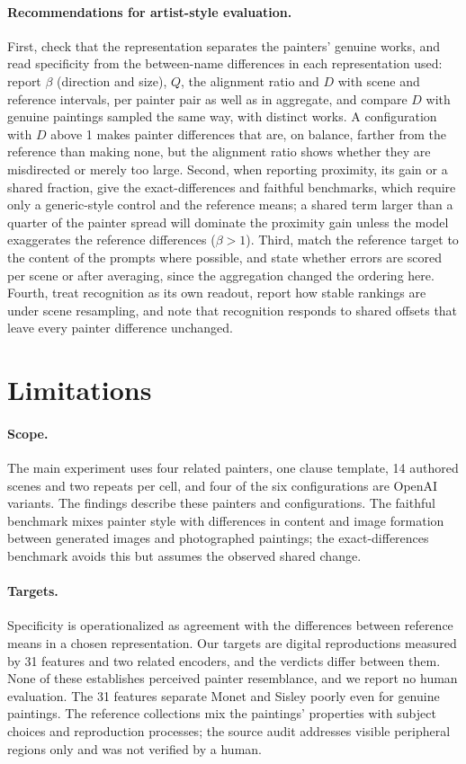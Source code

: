 \documentclass[10pt]{article}
\begin{document}
\paragraph{Recommendations for artist-style evaluation.}
First, check that the representation separates the painters' genuine works, and read specificity
from the between-name differences in each representation used: report $\beta$ (direction and size),
$Q$, the alignment ratio and $D$ with scene and reference intervals, per painter pair as well as in
aggregate, and compare $D$ with genuine paintings sampled the same way, with distinct works. A
configuration with $D$ above 1 makes painter differences that are, on balance, farther from the
reference than making none, but the alignment ratio shows whether they are misdirected or merely
too large. Second, when reporting proximity, its gain or a shared fraction, give the
exact-differences and faithful benchmarks, which require only a generic-style control and the
reference means; a shared term larger than a quarter of the painter spread will dominate the
proximity gain unless the model exaggerates the reference differences ($\beta>1$). Third, match the
reference target to the content of the prompts where possible, and state whether errors are scored
per scene or after averaging, since the aggregation changed the ordering here. Fourth, treat
recognition as its own readout, report how stable rankings are under scene resampling, and note
that recognition responds to shared offsets that leave every painter difference unchanged.

\section{Limitations}\label{sec:limitations}

\paragraph{Scope.} The main experiment uses four related painters, one clause template, 14 authored
scenes and two repeats per cell, and four of the six configurations are OpenAI variants. The
findings describe these painters and configurations. The faithful benchmark mixes painter style with
differences in content and image formation between generated images and photographed paintings; the
exact-differences benchmark avoids this but assumes the observed shared change.

\paragraph{Targets.} Specificity is operationalized as agreement with the differences between
reference means in a chosen representation. Our targets are digital reproductions measured by 31
features and two related encoders, and the verdicts differ between them. None of these establishes
perceived painter resemblance, and we report no human evaluation. The 31 features separate Monet
and Sisley poorly even for genuine paintings. The reference collections mix the paintings'
properties with subject choices and reproduction processes; the source audit addresses visible
peripheral regions only and was not verified by a human.
\end{document}
